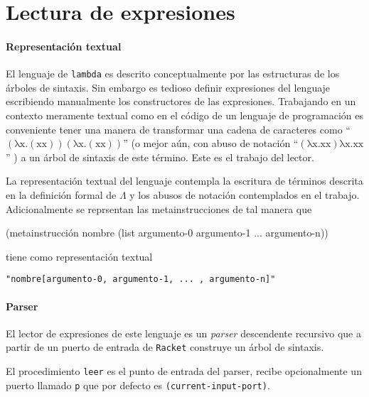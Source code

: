 \documentclass[letterpaper,twoside,openright,11pt]{book}
\begin{document}
\nwenddocs{}\section*{Lectura de expresiones}

\paragraph{Representación textual} El lenguaje de {\tt{}lambda} es descrito conceptualmente por las estructuras de los árboles de sintaxis. Sin embargo es tedioso definir expresiones del lenguaje escribiendo manualmente los constructores de las expresiones. Trabajando en un contexto meramente textual como en el código de un lenguaje de programación es conveniente tener una manera de transformar una cadena de caracteres como ``\( \mathrm{(λx.(x x))(λx.(x x))} \)'' (o mejor aún, con abuso de notación ``\( \mathrm{(λx.x x) λx.x x} \)'' ) a un árbol de sintaxis de este término. Este es el trabajo del lector.

La representación textual del lenguaje contempla la escritura de términos descrita en la definición formal de \( Λ \) y los abusos de notación contemplados en el trabajo. Adicionalmente se reprsentan las metainstrucciones de tal manera que

\nwenddocs{}\endmoddef
(metainstrucción nombre (list argumento-0 argumento-1 ... argumento-n))
\nwendcode{}\nwdocspar

tiene como representación textual

{\tt{}"nombre[argumento-0,\ argumento-1,\ ...\ ,\ argumento-n]"}

\paragraph{Parser} El lector de expresiones de este lenguaje es un \emph{parser} descendente recursivo que a partir de un puerto de entrada de {\tt{}Racket} construye un árbol de sintaxis.

El procedimiento {\tt{}\protect{}leer} es el punto de entrada del parser, recibe opcionalmente un puerto llamado {\tt{}p} que por defecto es {\tt{}(current-input-port)}.
\end{document}
